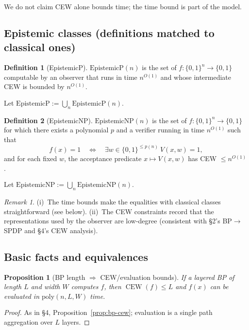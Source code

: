 \documentclass[12pt]{article}
\newtheorem{proposition}[theorem]{Proposition}
\theoremstyle{definition}
\newtheorem{definition}{Definition}
\theoremstyle{definition}
\theoremstyle{remark}
\newtheorem{remark}{Remark}
\theoremstyle{remark}
\begin{document}
We do not claim CEW alone bounds time; the time bound is part of the model.

\subsection{Epistemic classes (definitions matched to classical ones)}

\begin{definition}[EpistemicP]\label{def:epistemic-p-matched}
$\mathrm{EpistemicP}(n)$ is the set of $f:\{0,1\}^n\to\{0,1\}$ computable by an observer that runs in time $n^{O(1)}$ and whose intermediate CEW is bounded by $n^{O(1)}$.

Let $\mathrm{EpistemicP}:=\bigcup_n \mathrm{EpistemicP}(n)$.
\end{definition}

\begin{definition}[EpistemicNP]\label{def:epistemic-np-matched}
$\mathrm{EpistemicNP}(n)$ is the set of $f:\{0,1\}^n\to\{0,1\}$ for which there exists a polynomial $p$ and a verifier running in time $n^{O(1)}$ such that
\[
f(x)=1 \quad\Longleftrightarrow\quad \exists w\in\{0,1\}^{\le p(n)}\ V(x,w)=1,
\]
and for each fixed $w$, the acceptance predicate $x\mapsto V(x,w)$ has CEW $\le n^{O(1)}$.

Let $\mathrm{EpistemicNP}:=\bigcup_n \mathrm{EpistemicNP}(n)$.
\end{definition}

\begin{remark}
(i)~The time bounds make the equalities with classical classes straightforward (see below).
(ii)~The CEW constraints record that the representations used by the observer are low-degree (consistent with \S2's BP$\to$SPDP and \S4's CEW analysis).
\end{remark}

\subsection{Basic facts and equivalences}

\begin{proposition}[BP length $\Rightarrow$ CEW/evaluation bounds]\label{prop:bp-eval-bounds}
If a layered BP of length $L$ and width $W$ computes $f$, then $\operatorname{CEW}(f)\le L$ and $f(x)$ can be evaluated in $\mathrm{poly}(n,L,W)$ time.
\end{proposition}

\begin{proof}
As in \S4, Proposition~\ref{prop:bp-cew}; evaluation is a single path aggregation over $L$ layers.
\end{proof}
\end{document}
